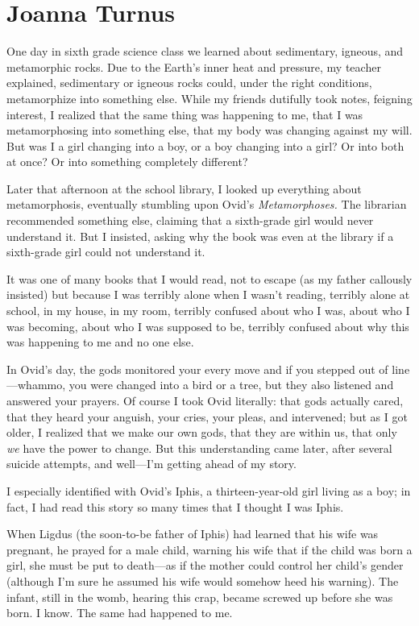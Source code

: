 \chapter{Joanna Turnus}

\titlemark

One day in sixth grade science class we learned about sedimentary,
igneous, and metamorphic rocks. Due to the Earth's inner heat and
pressure, my teacher explained, sedimentary or igneous rocks could,
under the right conditions, metamorphize into something else. While my
friends dutifully took notes, feigning interest, I realized that the
same thing was happening to me, that I was metamorphosing into something
else, that my body was changing against my will. But was I a girl
changing into a boy, or a boy changing into a girl? Or into both at
once? Or into something completely different?

Later that afternoon at the school library, I looked up everything about
metamorphosis, eventually stumbling upon Ovid's \emph{Metamorphoses.}
The librarian recommended something else, claiming that a sixth-grade
girl would never understand it. But I insisted, asking why the book was
even at the library if a sixth-grade girl could not understand it.

It was one of many books that I would read, not to escape (as my father
callously insisted) but because I was terribly alone when I wasn't
reading, terribly alone at school, in my house, in my room, terribly
confused about who I was, about who I was becoming, about who I was
supposed to be, terribly confused about why this was happening to me and
no one else.

In Ovid's day, the gods monitored your every move and if you stepped out
of line---whammo, you were changed into a bird or a tree, but they also
listened and answered your prayers. Of course I took Ovid literally:
that gods actually cared, that they heard your anguish, your cries, your
pleas, and intervened; but as I got older, I realized that we make our
own gods, that they are within us, that only \emph{we} have the power to
change. But this understanding came later, after several suicide
attempts, and well---I'm getting ahead of my story.

I especially identified with Ovid's Iphis, a thirteen-year-old girl
living as a boy; in fact, I had read this story so many times that I
thought I was Iphis.

When Ligdus (the soon-to-be father of Iphis) had learned that his wife
was pregnant, he prayed for a male child, warning his wife that if the
child was born a girl, she must be put to death---as if the mother could
control her child's gender (although I'm sure he assumed his wife would
somehow heed his warning). The infant, still in the womb, hearing this
crap, became screwed up before she was born. I know. The same had
happened to me.

